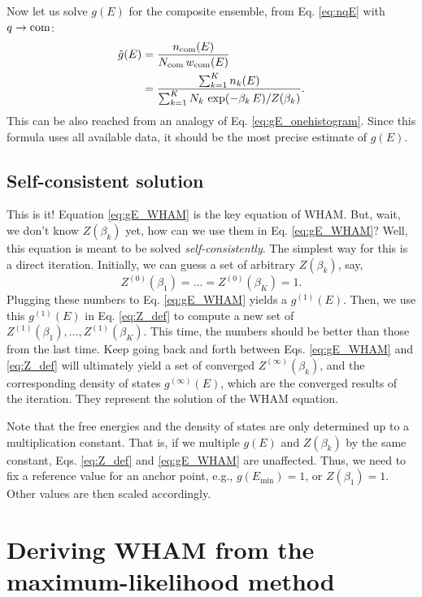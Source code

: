 \documentclass[aip,jcp,preprint,superscriptaddress]{revtex4-1}
\begin{document}
Now let us solve $g(E)$
for the composite ensemble,
from Eq. \eqref{eq:nqE}
with $q \rightarrow \mathrm{com}$:
%
\begin{align}
\hat g(E)
&=
\frac{ n_{\mathrm{com}}(E) }
{ N_{\mathrm{com}} \, w_{\mathrm{com}}(E) }
\notag \\
&=
\frac{ \sum_{k = 1}^K n_k(E) }
{ \sum_{k = 1}^K N_k \, \exp( -\beta_k \, E ) / Z(\beta_k) }.
\label{eq:gE_WHAM}
\end{align}
%
This can be also reached from an analogy
of Eq. \eqref{eq:gE_onehistogram}.
%
Since this formula uses all available data,
it should be the most precise estimate of $g(E)$.




\subsection{Self-consistent solution}


This is it!
%
Equation \eqref{eq:gE_WHAM} is the key equation of WHAM.
%
But, wait, we don't know $Z(\beta_k)$ yet,
how can we use them in Eq. \eqref{eq:gE_WHAM}?
%
Well, this equation is meant to be solved
\emph{self-consistently}.
%
The simplest way for this is a direct iteration.
%
Initially,
we can guess a set of arbitrary
$Z(\beta_k)$,
say,
\[
  Z^{(0)}(\beta_1) = \dots = Z^{(0)}(\beta_K) = 1.
\]
%
Plugging these numbers to Eq. \eqref{eq:gE_WHAM}
yields a $g^{(1)}(E)$.
%
Then, we use this $g^{(1)}(E)$ in Eq. \eqref{eq:Z_def}
to compute a new set of
$Z^{(1)}(\beta_1), \dots, Z^{(1)}(\beta_K)$.
%
This time, the numbers should be better
than those from the last time.
%
Keep going back and forth
between Eqs. \eqref{eq:gE_WHAM} and \eqref{eq:Z_def}
will ultimately yield a set of converged
$Z^{(\infty)}(\beta_k)$,
and the corresponding density of states
$g^{(\infty)}(E)$,
which are the converged results of the iteration.
%
They represent the solution of the WHAM equation.



Note that the free energies and the density of states
are only determined up to a multiplication constant.
%
That is,
if we multiple $g(E)$ and $Z(\beta_k)$
by the same constant,
Eqs. \eqref{eq:Z_def} and \eqref{eq:gE_WHAM}
are unaffected.
%
Thus, we need to
fix a reference value for an anchor point,
e.g.,
$g(E_{\min}) = 1$,
or
$Z(\beta_1) = 1$.
%
Other values are then scaled accordingly.





\section{\label{sec:WHAM_maxlikelihood}
Deriving WHAM from the maximum-likelihood method}
\end{document}
